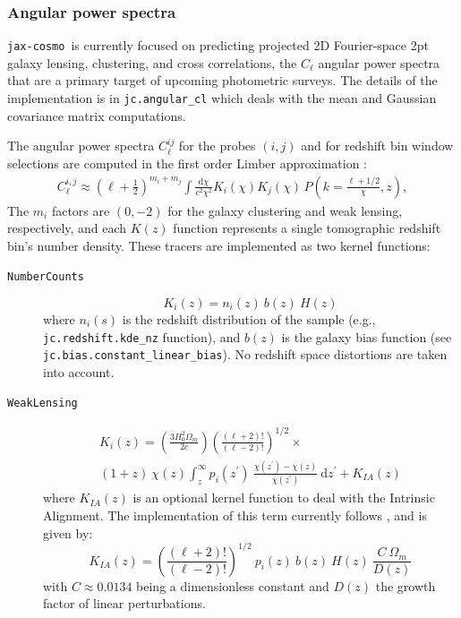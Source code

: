 \documentclass[twocolumn,twocolappendix,nofootinbib,iop]{openjournal}
\newcommand{\JZ}[1]{{\color{purple}JZ: #1}}
\newcommand{\jaxcosmo}{\texttt{jax-cosmo}}
\newcommand{\jax}{\texttt{JAX}}
\begin{document}
%
\subsubsection{Angular power spectra}
%
\jaxcosmo\ is currently focused on predicting projected 2D Fourier-space 2pt galaxy lensing, clustering, and cross correlations, the $C_\ell$ angular power spectra that are a primary target of upcoming photometric surveys. The details of the implementation is in \texttt{jc.angular\_cl} which deals with the mean and Gaussian covariance matrix computations.

The angular power spectra $C_\ell^{ij}$ for the probes $(i,j)$ and for redshift bin window selections are computed in the first order Limber approximation \citep{PhysRevD.78.123506}:
\begin{align}
    C_\ell^{i,j} \approx \left(\ell+\frac{1}{2}\right)^{m_i+m_j}\int\frac{\mathrm{d}\chi}{c^2\chi^2}K_i(\chi)K_j(\chi)\,P\left(k=\frac{\ell+1/2}{\chi},z\right),\label{eq:Cell_limber}
\end{align}
The $m_i$ factors are $(0,-2)$ for the galaxy clustering and weak lensing, respectively, and each $K(z)$ function represents a single tomographic redshift bin's number density. These tracers are implemented as two kernel functions:

\begin{description}
\item[\texttt{NumberCounts}]
    \begin{equation}
        K_i(z) = n_i(z)\ b(z)\ H(z)
    \end{equation}
where $n_i(s)$ is the redshift distribution of the sample (e.g., \texttt{jc.redshift.kde\_nz} function), and $b(z)$ is the galaxy bias function (see  \texttt{jc.bias.constant\_linear\_bias}). No redshift space distortions are taken into account.

\item [\texttt{WeakLensing}]
    \begin{multline}
 K_i(z) = \left( \frac{3 H_0^2\Omega_m}{2 c} \right) \left(\frac{(\ell+2)!}{(\ell-2)!} \right)^{1/2}\times 
 \\  (1+z)\ \chi(z) \int_z^\infty p_i(z^\prime)\ \frac{\chi(z^\prime)-\chi(z)}{\chi(z^\prime)}\ \mathrm{d}z^\prime + K_{IA}(z)
    \end{multline}
where $K_{IA}(z)$ is an optional kernel function to deal with the Intrinsic Alignment. The implementation of this term currently follows \citet{2011A&A...527A..26J}, and is given by:
\begin{equation}
    K_{IA}(z) = \left(\frac{(\ell+2)!}{(\ell-2)!}\right)^{1/2}\ p_i(z)\ b(z)\  H(z)\ \frac{C\  \Omega_m}{D(z)}
\end{equation}
with $C\approx 0.0134$ being a dimensionless constant and $D(z)$ the growth factor of linear perturbations.
\end{description}
\end{document}
